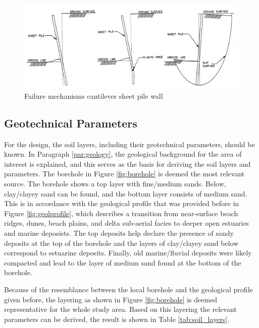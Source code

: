 \begin{figure}[H]
    \centering
    \includegraphics[width=0.90\linewidth]{figures/ch8/failure_mechanisms.png}
    \caption{Failure mechanisms cantilever sheet pile wall \autocite{brownDesignSheetPile1994}}
    \label{fig:failure_mechanisms_sheetpiles}
\end{figure}


\subsection{Geotechnical Parameters}
\label{section:geotechnical_parameters}

For the design, the soil layers, including their geotechnical parameters, should be known. In Paragraph \ref{par:geology}, the geological background for the area of interest is explained, and this serves as the basis for deriving the soil layers and parameters. The borehole in Figure \ref{fig:borehole} is deemed the most relevant source. The borehole shows a top layer with fine/medium sands. Below, clay/clayey sand can be found, and the bottom layer consists of medium sand. This is in accordance with the geological profile that was provided before in Figure \ref{fig:geolprofile}, which describes a transition from near-surface beach ridges, dunes, beach plains, and delta sub-aerial facies to deeper open estuaries and marine deposists. The top deposits help declare the presence of sandy deposits at the top of the borehole and the layers of clay/clayey sand below correspond to estuarine deposits. Finally, old marine/fluvial deposits were likely compacted and lead to the layer of medium sand found at the bottom of the borehole.

Because of the resemblance between the local borehole and the geological profile given before, the layering as shown in Figure \ref{fig:borehole} is deemed representative for the whole study area. Based on this layering the relevant parameters can be derived, the result is shown in Table \ref{tab:soil_layers}.

